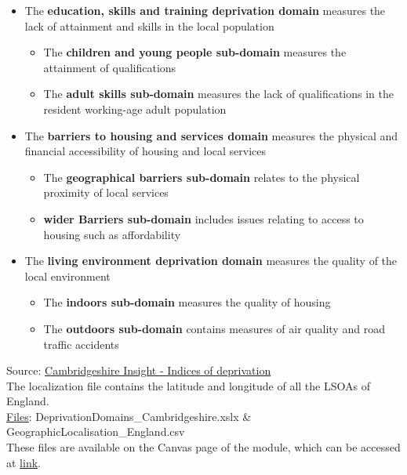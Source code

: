 \documentclass[11pt]{article}
\begin{document}
\begin{itemize}
    \item The \textbf{education, skills and training deprivation domain} measures the lack of attainment and skills in the local population
    \begin{itemize}
        \item The \textbf{children and young people sub-domain} measures the attainment of qualifications
        \item The \textbf{adult skills sub-domain} measures the lack of qualifications in the resident working-age adult population
    \end{itemize}
    \item The \textbf{barriers to housing and services domain} measures the physical and financial accessibility of housing and local services
    \begin{itemize}
        \item The \textbf{geographical barriers sub-domain} relates to the physical proximity of local services
        \item \textbf{wider Barriers sub-domain} includes issues relating to access to housing such as affordability
    \end{itemize}
    \item The \textbf{living environment deprivation domain} measures the quality of the local environment
    \begin{itemize}
        \item The \textbf{indoors sub-domain} measures the quality of housing
        \item The \textbf{outdoors sub-domain} contains measures of air quality and road traffic accidents
    \end{itemize}
\end{itemize}
Source: \href{https://data.cambridgeshireinsight.org.uk/dataset/indices-deprivation}{Cambridgeshire Insight - Indices of deprivation}\\

The localization file contains the latitude and longitude of all the LSOAs of England.\\
    
\underline{Files}: DeprivationDomains\_Cambridgeshire.xslx \& GeographicLocalisation\_England.csv\\
These files are available on the Canvas page of the module, which can be accessed at \href{https://ncl.instructure.com/courses/49730}{link}.\\
\end{document}
